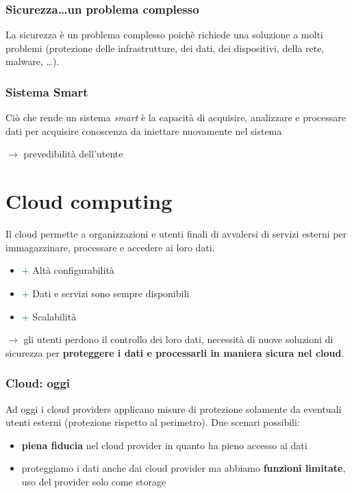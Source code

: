 \documentclass{report}
\begin{document}
\subsubsection{Sicurezza\dots un problema complesso}
La sicurezza è un problema complesso poichè richiede una soluzione a molti problemi (protezione delle infrastrutture, dei dati, dei dispositivi, della rete, malware, \dots).

\subsubsection{Sistema Smart}
Ciò che rende un sistema \textit{smart} è la capacità di acquisire, analizzare e processare dati per acquisire conoscenza 
da iniettare nuovamente nel sistema 

$ \rightarrow $ prevedibilità dell'utente

\section{Cloud computing}
Il cloud permette a organizzazioni e utenti finali di avvalersi di servizi esterni per 
immagazzinare, processare e accedere ai loro dati.
\begin{itemize}
    \item \textcolor{darkgreen}{+} Altà configurabilità
    \item \textcolor{darkgreen}{+} Dati e servizi sono sempre disponibili
    \item \textcolor{darkgreen}{+} Scalabilità
\end{itemize}

$ \rightarrow $ gli utenti perdono il controllo dei loro dati, necessità di nuove soluzioni di sicurezza per \textbf{proteggere i dati e 
processarli in maniera sicura nel cloud}.

\subsubsection{Cloud: oggi}
Ad oggi i cloud providers applicano misure di protezione solamente da eventuali utenti esterni (protezione rispetto al perimetro).
Due scenari possibili:
\begin{itemize}
    \item \textbf{piena fiducia} nel cloud provider in quanto ha pieno accesso ai dati
    \item proteggiamo i dati anche dai cloud provider ma abbiamo \textbf{funzioni limitate}, uso del provider solo come storage
\end{itemize}
\end{document}
